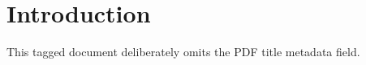 \documentclass[11pt]{article}
\begin{document}
\section{Introduction}
This tagged document deliberately omits the PDF title metadata field.
\end{document}
